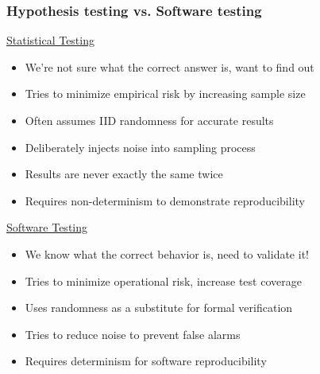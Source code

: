 \documentclass{beamer}
\begin{document}
\begin{frame}
\frametitle{Hypothesis testing vs. Software testing}
\begin{multicols}{2}
\underline{Statistical Testing}
\begin{itemize}
\item We're not sure what the correct answer is, want to find out
\item Tries to minimize empirical risk by increasing sample size
\item Often assumes IID randomness for accurate results
\item Deliberately injects noise into sampling process
\item Results are never exactly the same twice
\item Requires non-determinism to demonstrate reproducibility
\end{itemize}
\vfill\null
\columnbreak
\underline{Software Testing}
\begin{itemize}
\item We know what the correct behavior is, need to validate it!
\item Tries to minimize operational risk, increase test coverage
\item Uses randomness as a substitute for formal verification
\item Tries to reduce noise to prevent false alarms
\item Requires determinism for software reproducibility
\end{itemize}
\end{multicols}
\end{frame}


%
\end{document}
